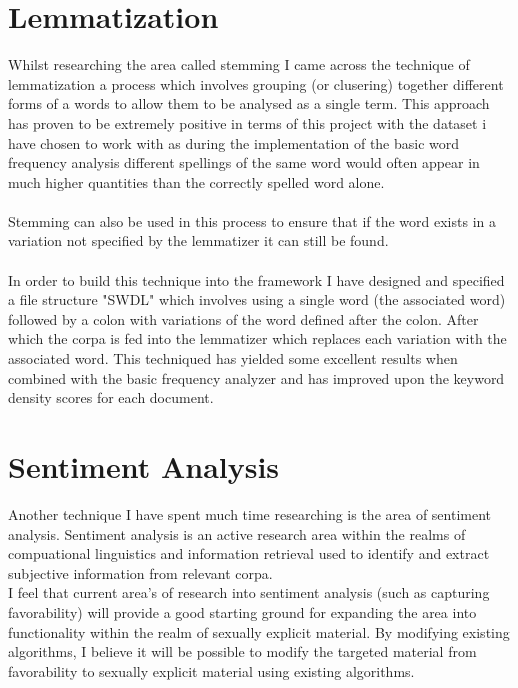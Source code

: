 \documentclass{report}
\begin{document}
\section*{Lemmatization}
Whilst researching the area called stemming I came across the technique of lemmatization a process which involves grouping (or clusering) together different forms of a words to allow them to be analysed as a single term. This approach has proven to be extremely positive in terms of this project with the dataset i have chosen to work with as during the implementation of the basic word frequency analysis different spellings of the same word would often appear in much higher quantities than the correctly spelled word alone.
\\
\\
Stemming can also be used in this process to ensure that if the word exists in a variation not specified by the lemmatizer it can still be found.
\\
\\

In order to build this technique into the framework I have designed and specified a file structure "SWDL" which involves using a single word (the associated word) followed by a colon with variations of the word defined after the colon. After which the corpa is fed into the lemmatizer which replaces each variation with the associated word. This techniqued has yielded some excellent results when combined with the basic frequency analyzer and has improved upon the keyword density scores for each document.

\section*{Sentiment Analysis}
Another technique I have spent much time researching is the area of sentiment analysis. Sentiment analysis is an active research area within the realms of compuational linguistics and information retrieval used to identify and extract subjective information from relevant corpa. 
\\
I feel that current area's of research into sentiment analysis (such as capturing favorability) will provide a good starting ground for expanding the area into functionality within the realm of sexually explicit material. By modifying existing algorithms, I believe it will be possible to modify the targeted material from favorability to sexually explicit material using existing algorithms.
\end{document}
